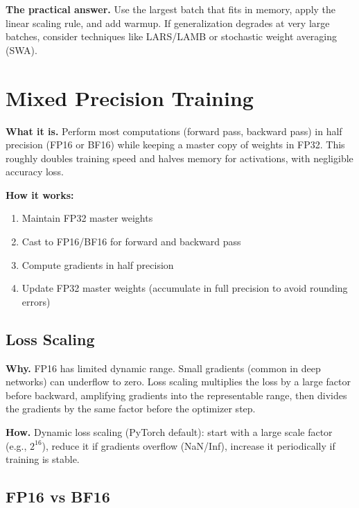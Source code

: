 \textbf{The practical answer.} Use the largest batch that fits in memory, apply the linear scaling rule, and add warmup. If generalization degrades at very large batches, consider techniques like LARS/LAMB or stochastic weight averaging (SWA).

\section{Mixed Precision Training}
\label{sec:mixed_precision}

\textbf{What it is.} Perform most computations (forward pass, backward pass) in half precision (FP16 or BF16) while keeping a master copy of weights in FP32. This roughly doubles training speed and halves memory for activations, with negligible accuracy loss.

\textbf{How it works:}
\begin{enumerate}
    \item Maintain FP32 master weights
    \item Cast to FP16/BF16 for forward and backward pass
    \item Compute gradients in half precision
    \item Update FP32 master weights (accumulate in full precision to avoid rounding errors)
\end{enumerate}

\subsection{Loss Scaling}

\textbf{Why.} FP16 has limited dynamic range. Small gradients (common in deep networks) can underflow to zero. Loss scaling multiplies the loss by a large factor before backward, amplifying gradients into the representable range, then divides the gradients by the same factor before the optimizer step.

\textbf{How.} Dynamic loss scaling (PyTorch default): start with a large scale factor (e.g., $2^{16}$), reduce it if gradients overflow (NaN/Inf), increase it periodically if training is stable.

\subsection{FP16 vs BF16}

